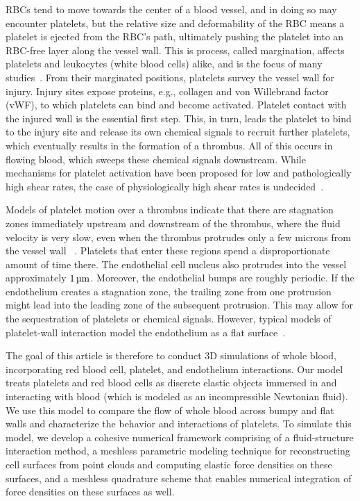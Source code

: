 RBCs tend to move towards the center of a blood vessel, and in doing so may encounter
platelets, but the relative size and deformability of the RBC means a platelet is ejected
from the RBC's path, ultimately pushing the platelet into an RBC-free layer along the
vessel wall. This is process, called margination, affects platelets and leukocytes (white
blood cells) alike, and is the focus of many studies~\cite{Freund:2007kx,Erickson:2010ep,
Erickson:2011cf,Zhao:2011do,Kumar:2011dd,Zhao:2012ggba,Fedosov:2012dy,Kumar:2012ie,
Fedosov:2013ul,Muller:2014is,Fedosov:2014bs, Vahidkhah:2014hy,Vahidkhah:2015ch,
Mehrabadi:2016fn}. From their marginated positions, platelets survey the vessel wall for
injury. Injury sites expose proteins, e.g., collagen and von Willebrand factor (vWF), to which
platelets can bind and become activated. Platelet contact with the injured wall is the
essential first step. This, in turn, leads the platelet to bind to the injury site and
release its own chemical signals to recruit further platelets, which eventually results
in the formation of a thrombus. All of this occurs in flowing blood, which sweeps these
chemical signals downstream. While mechanisms for platelet activation have been proposed
for low and pathologically high shear rates, the case of physiologically high shear rates
is undecided~\cite{Fogelson:2015fb}.

Models of platelet motion over a thrombus indicate that there are stagnation zones
immediately upstream and downstream of the thrombus, where the fluid velocity is very
slow, even when the thrombus protrudes only a few microns from the vessel wall~%
\cite{Skorczewski:2013jn,Wang:2013gs}. Platelets that enter these regions spend a
disproportionate amount of time there. The endothelial cell nucleus also protrudes into
the vessel approximately $1\um$. Moreover, the endothelial bumps are roughly periodic. If
the endothelium creates a stagnation zone, the trailing zone from one protrusion might
lead into the leading zone of the subsequent protrusion. This may allow for the
sequestration of platelets or chemical signals. However, typical models of platelet-wall
interaction model the endothelium as a flat surface~\cite{Wu:2014gt,Vahidkhah:2015ch}.

The goal of this article is therefore to conduct 3D simulations of whole blood, incorporating
red blood cell, platelet, and endothelium interactions. Our model treats platelets and red blood cells
as discrete elastic objects immersed in and interacting with blood (which is modeled as an incompressible
Newtonian fluid). We use this model to compare the flow of
whole blood across bumpy and flat walls and characterize the behavior and interactions of platelets. To
simulate this model, we develop a cohesive numerical framework comprising of
a fluid-structure interaction method, a meshless parametric modeling technique for reconstructing cell
surfaces from point clouds and computing elastic force densities on these surfaces, and a meshless quadrature
scheme that enables numerical integration of force densities on these surfaces as well.

